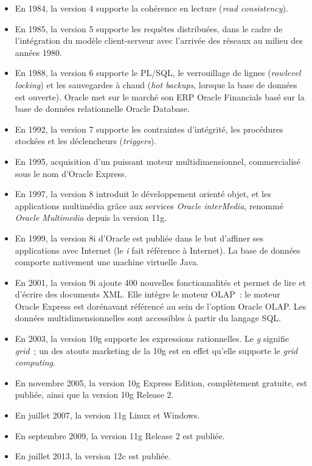 \documentclass[12pt,a4paper]{report}
\begin{document}
\begin{itemize}[leftmargin=*]
  \item En 1984, la version 4 supporte la cohérence en lecture (\emph{read
        consistency}).
  \item En 1985, la version 5 supporte les requêtes distribuées, dans le cadre de
        l'intégration du modèle client-serveur avec l'arrivée des réseaux au milieu
        des années 1980.
  \item En 1988, la version 6 supporte le PL/SQL, le verrouillage de lignes
        (\emph{rowlevel locking}) et les sauvegardes à chaud (\emph{hot backups},
        lorsque la base de données est ouverte). Oracle met sur le marché son ERP
        Oracle Financials basé sur la base de données relationnelle Oracle
        Database.
  \item En 1992, la version 7 supporte les contraintes d'intégrité, les procédures
        stockées et les déclencheurs (\emph{triggers}).
  \item En 1995, acquisition d'un puissant moteur multidimensionnel, commercialisé
        sous le nom d'Oracle Express.
  \item En 1997, la version 8 introduit le développement orienté objet, et les
        applications multimédia grâce aux services \emph{Oracle interMedia}, renommé
        \emph{Oracle Multimedia} depuis la version 11g.
  \item En 1999, la version 8i d'Oracle est publiée dans le but d'affiner ses
        applications avec Internet (le \emph{i} fait référence à Internet). La base
        de données comporte nativement une machine virtuelle Java.
  \item En 2001, la version 9i ajoute 400 nouvelles fonctionnalités et permet de
        lire et d'écrire des documents XML. Elle intègre le moteur OLAP~: le moteur
        Oracle Express est dorénavant référencé au sein de l'option Oracle OLAP. Les
        données multidimensionnelles sont accessibles à partir du langage SQL.
  \item En 2003, la version 10g supporte les expressions rationnelles. Le \emph{g}
        signifie \emph{grid}~; un des atouts marketing de la 10g est en effet
        qu'elle supporte le \emph{grid computing}.
  \item En novembre 2005, la version 10g Express Edition, complètement gratuite, est
        publiée, ainsi que la version 10g Release 2.
  \item En juillet 2007, la version 11g Linux et Windows.
  \item En septembre 2009, la version 11g Release 2 est publiée.
  \item En juillet 2013, la version 12c est publiée.
\end{itemize}
\end{document}
